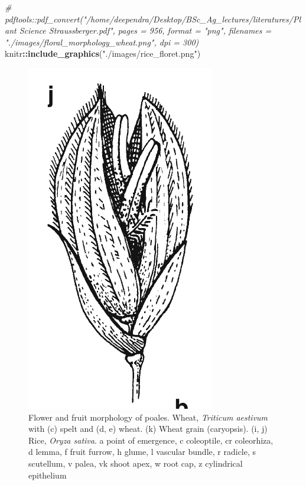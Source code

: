 \documentclass[]{book}
\newenvironment{Shaded}{\begin{snugshade}}{\end{snugshade}}
\newcommand{\CommentTok}[1]{\textcolor[rgb]{0.56,0.35,0.01}{\textit{#1}}}
\newcommand{\KeywordTok}[1]{\textcolor[rgb]{0.13,0.29,0.53}{\textbf{#1}}}
\newcommand{\NormalTok}[1]{#1}
\newcommand{\OperatorTok}[1]{\textcolor[rgb]{0.81,0.36,0.00}{\textbf{#1}}}
\newcommand{\StringTok}[1]{\textcolor[rgb]{0.31,0.60,0.02}{#1}}
\begin{document}
\begin{Shaded}
\begin{Highlighting}[]
\CommentTok{# pdftools::pdf_convert("/home/deependra/Desktop/BSc_Ag_lectures/literatures/Plant Science Straussberger.pdf", pages = 956, format = "png", filenames = "./images/floral_morphology_wheat.png", dpi = 300)}
\NormalTok{knitr}\OperatorTok{::}\KeywordTok{include_graphics}\NormalTok{(}\StringTok{"./images/rice_floret.png"}\NormalTok{)}
\end{Highlighting}
\end{Shaded}

\begin{figure}

{\centering \includegraphics[width=0.55\linewidth]{./images/rice_floret} 

}

\caption{Flower and fruit morphology of poales. Wheat, \textit{Triticum aestivum} with (c) spelt and (d, e) wheat. (k) Wheat grain (caryopsis). (i, j) Rice, \textit{Oryza sativa}. a point of emergence, c coleoptile, cr coleorhiza, d lemma, f fruit furrow, h glume, l vascular bundle, r radicle, s scutellum, v palea, vk shoot apex, w root cap, z cylindrical epithelium}\label{fig:floral-morphology-poales}
\end{figure}
\end{document}
